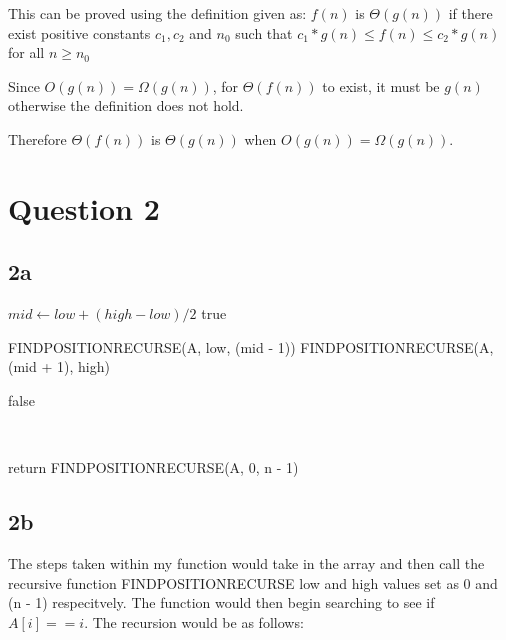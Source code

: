 \documentclass[oneside, a4paper]{article}
\begin{document}
This can be proved using the definition given as:
$f(n)$ is $\Theta(g(n))$ if there exist positive constants $c_1, c_2$ and $n_0$ such that $c_1 * g(n) \leq f(n) \leq c_2 * g(n)$ for all $n \geq n_0$

Since $O(g(n)) = \Omega(g(n))$, for $\Theta(f(n))$ to exist, it must be $g(n)$ otherwise the definition does not hold. 

Therefore $\Theta(f(n))$ is $\Theta(g(n))$ when $O(g(n)) = \Omega(g(n))$.

\newpage

\setcounter{secnumdepth}{-1}
\section{Question 2}

\subsection{2a}
\begin{algorithmic}
            \State $mid \gets low + (high - low) / 2$
                \State \Return true    
            \EndIf
                
                \State \Return FINDPOSITIONRECURSE(A, low, (mid - 1))
            \Else
                \State \Return FINDPOSITIONRECURSE(A, (mid + 1), high)
            \EndIf

        \Else 
            \State \Return false    
        \EndIf
        
    \EndFunction
\end{algorithmic}
\
\
\begin{algorithmic}
        \State return FINDPOSITIONRECURSE(A, 0, n - 1)
    \EndFunction
\end{algorithmic}


\subsection{2b}
The steps taken within my function would take in the array and then call the recursive function FINDPOSITIONRECURSE low and high values set as 0 and (n - 1) respecitvely. The function would then begin searching to see if $A[i] == i$. The recursion would be as follows:
\end{document}

